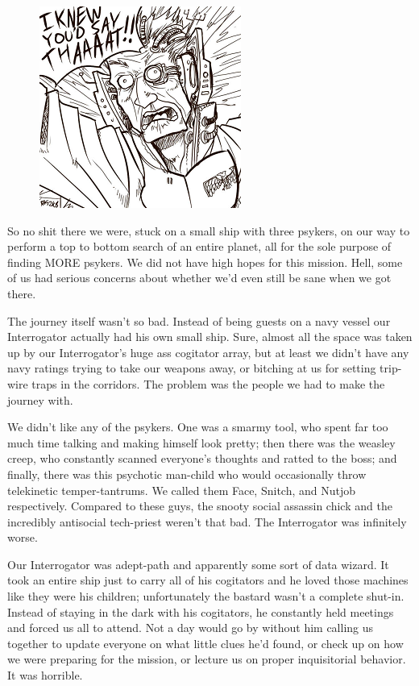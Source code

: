 \begin{figure}
	\begin{center}
		\includegraphics[width=\figwidth]{pics/3/6.png}
	\end{center}
\end{figure}
So no shit there we were, stuck on a small ship with three psykers, on our way to perform a top to bottom search of an entire planet, all for the sole purpose of finding MORE psykers. 
We did not have high hopes for this mission. Hell, some of us had serious concerns about whether we’d even still be sane when we got there.

The journey itself wasn’t so bad. Instead of being guests on a navy vessel our Interrogator actually had his own small ship. 
Sure, almost all the space was taken up by our Interrogator's huge ass cogitator array, but at least we didn’t have any navy ratings trying to take our weapons away, or bitching at us for setting trip-wire traps in the corridors. 
The problem was the people we had to make the journey with.

We didn’t like any of the psykers. 
One was a smarmy tool, who spent far too much time talking and making himself look pretty; then there was the weasley creep, who constantly scanned everyone’s thoughts and ratted to the boss; and finally, there was this psychotic man-child who would occasionally throw telekinetic temper-tantrums. 
We called them Face, Snitch, and Nutjob respectively. 
Compared to these guys, the snooty social assassin chick and the incredibly antisocial tech-priest weren’t that bad. 
The Interrogator was infinitely worse. 

Our Interrogator was adept-path and apparently some sort of data wizard. 
It took an entire ship just to carry all of his cogitators and he loved those machines like they were his children; unfortunately the bastard wasn’t a complete shut-in. 
Instead of staying in the dark with his cogitators, he constantly held meetings and forced us all to attend. 
Not a day would go by without him calling us together to update everyone on what little clues he’d found, or check up on how we were preparing for the mission, or lecture us on proper inquisitorial behavior. 
It was horrible.

